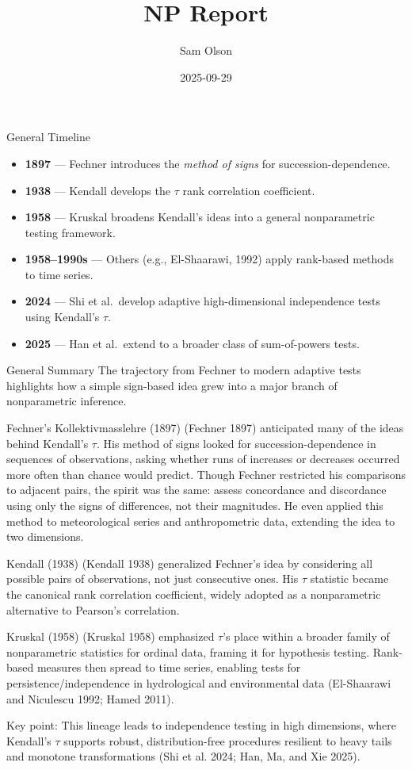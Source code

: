 \documentclass[
  ignorenonframetext,
]{beamer}
\title{NP Report}
\author{Sam Olson}
\date{2025-09-29}
\providecommand{\tightlist}{%
  \setlength{\itemsep}{0pt}\setlength{\parskip}{0pt}}
\begin{document}
\frame{\titlepage}

\begin{frame}{General Timeline}
\label{general-timeline}
\begin{itemize}
\tightlist
\item
  \textbf{1897} --- Fechner introduces the \emph{method of signs} for
  succession-dependence.
\item
  \textbf{1938} --- Kendall develops the \(\tau\) rank correlation
  coefficient.
\item
  \textbf{1958} --- Kruskal broadens Kendall's ideas into a general
  nonparametric testing framework.
\item
  \textbf{1958--1990s} --- Others (e.g., El-Shaarawi, 1992) apply
  rank-based methods to time series.
\item
  \textbf{2024} --- Shi et al.~develop adaptive high-dimensional
  independence tests using Kendall's \(\tau\).
\item
  \textbf{2025} --- Han et al.~extend to a broader class of
  sum-of-powers tests.
\end{itemize}
\end{frame}

\begin{frame}[allowframebreaks]{General Summary}
\label{general-summary}
The trajectory from Fechner to modern adaptive tests highlights how a
simple sign-based idea grew into a major branch of nonparametric
inference.

Fechner's Kollektivmasslehre (1897) (Fechner 1897) anticipated many of
the ideas behind Kendall's \(\tau\). His method of signs looked for
succession-dependence in sequences of observations, asking whether runs
of increases or decreases occurred more often than chance would predict.
Though Fechner restricted his comparisons to adjacent pairs, the spirit
was the same: assess concordance and discordance using only the signs of
differences, not their magnitudes. He even applied this method to
meteorological series and anthropometric data, extending the idea to two
dimensions.

Kendall (1938) (Kendall 1938) generalized Fechner's idea by considering
all possible pairs of observations, not just consecutive ones. His
\(\tau\) statistic became the canonical rank correlation coefficient,
widely adopted as a nonparametric alternative to Pearson's correlation.

Kruskal (1958) (Kruskal 1958) emphasized \(\tau\)'s place within a
broader family of nonparametric statistics for ordinal data, framing it
for hypothesis testing. Rank-based measures then spread to time series,
enabling tests for persistence/independence in hydrological and
environmental data (El-Shaarawi and Niculescu 1992; Hamed 2011).

Key point: This lineage leads to independence testing in high
dimensions, where Kendall's \(\tau\) supports robust, distribution-free
procedures resilient to heavy tails and monotone transformations (Shi et
al. 2024; Han, Ma, and Xie 2025).
\end{frame}
\end{document}
